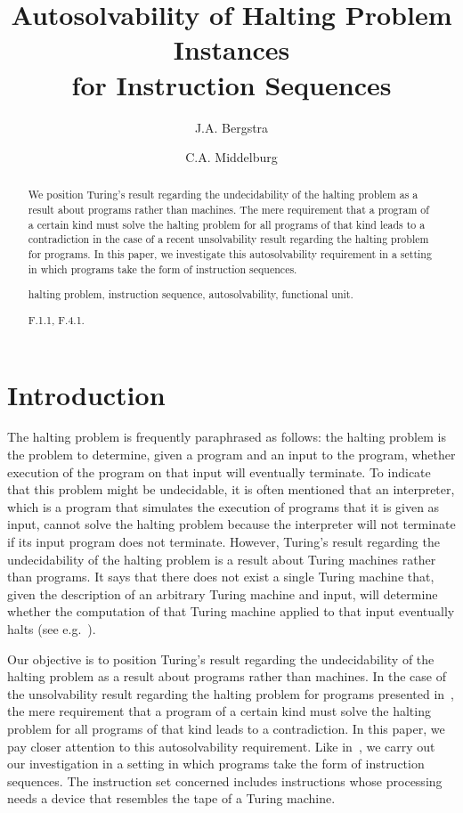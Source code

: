 \documentclass[fleqn]{llncs}
\title{Autosolvability of Halting Problem Instances \\
       for Instruction Sequences}
\author{J.A. Bergstra \and C.A. Middelburg }
\institute{Informatics Institute, Faculty of Science,
           University of Amsterdam, \\
           Science Park~107, 1098~XG Amsterdam, the Netherlands \\
           \email{J.A.Bergstra@uva.nl,C.A.Middelburg@uva.nl}}
\begin{document}
\maketitle

\begin{abstract}
We position Turing's result regarding the undecidability of the halting
problem as a result about programs rather than machines.
The mere requirement that a program of a certain kind must solve the
halting problem for all programs of that kind leads to a contradiction
in the case of a recent unsolvability result regarding the halting
problem for programs.
In this paper, we investigate this autosolvability requirement in a
setting in which programs take the form of instruction sequences.
\begin{keywords}
halting problem, instruction sequence, autosolvability,
functional unit.
\end{keywords}
\begin{classcode}
F.1.1, F.4.1.
\end{classcode}
\end{abstract}

\section{Introduction}
\label{sect-intro}

The halting problem is frequently paraphrased as follows: the halting
problem is the problem to determine, given a program and an input to the
program, whether execution of the program on that input will eventually
terminate.
To indicate that this problem might be undecidable, it is often
mentioned that an interpreter, which is a program that simulates the
execution of programs that it is given as input, cannot solve the
halting problem because the interpreter will not terminate if its input
program does not terminate.
However, Turing's result regarding the undecidability of the halting
problem is a result about Turing machines rather than programs.
It says that there does not exist a single Turing machine that, given
the description of an arbitrary Turing machine and input, will determine
whether the computation of that Turing machine applied to that input
eventually halts (see e.g.~\cite{Tur37a}).

Our objective is to position Turing's result regarding the
undecidability of the halting problem as a result about programs rather
than machines.
In the case of the unsolvability result regarding the halting problem
for programs presented in~\cite{BP04a}, the mere requirement that a
program of a certain kind must solve the halting problem for all
programs of that kind leads to a contradiction.
In this paper, we pay closer attention to this autosolvability
requirement.
Like in~\cite{BP04a}, we carry out our investigation in a setting in
which programs take the form of instruction sequences.
The instruction set concerned includes instructions whose processing
needs a device that resembles the tape of a Turing machine.
\end{document}
